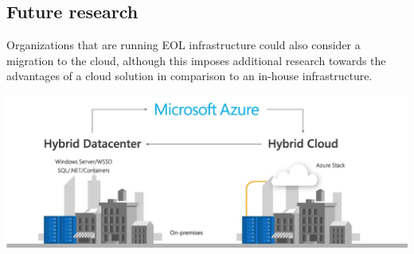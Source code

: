 \documentclass[a0,portrait]{a0poster}
\begin{document}
\begin{multicols}{2}
\section*{Future research}
\color{black}
Organizations that are running EOL infrastructure could also consider a migration to the cloud, although this imposes additional research towards the advantages of a cloud solution in comparison to an in-house infrastructure.
\begin{center}
    \includegraphics[width=1.0\linewidth]{../bachproef/img/Toekomstvisie/Azure1.png}
\end{center}
\end{multicols}
\end{document}
